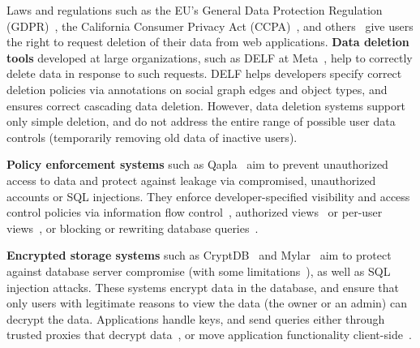 Laws and regulations such as the EU's General Data Protection Regulation
(GDPR)~\cite{eu:gdpr}, the California Consumer Privacy Act (CCPA)~\cite{ccpa},
and others~\cite{va:privacy-act, china:gdpr-like} give users the right to
request deletion of their data from web applications.
%
\textbf{Data deletion tools} developed at large organizations, such as DELF at
Meta~\cite{delf}, help to correctly delete data in response to such requests.
%
DELF helps developers specify correct deletion policies via annotations on
social graph edges and object types, and ensures correct cascading data
deletion.
%
However, data deletion systems support only simple deletion, and do not address
the entire range of possible user data controls (\eg temporarily removing old data of
inactive users). 
%
%
%
%

%
\textbf{Policy enforcement systems} such as Qapla~\cite{qapla} aim to prevent
unauthorized access to data and protect against leakage via compromised,
unauthorized accounts or SQL injections.
%
They enforce developer-specified visibility and access control policies via
information flow control~\cite{static, jeeves, jif, hails, ifdb}, authorized
views~\cite{oracle} or per-user views~\cite{multiverse}, or blocking or
rewriting database queries~\cite{blockaid, qapla, sieve}.
%
%
%
%
%

\textbf{Encrypted storage systems} such as CryptDB~\cite{cryptdb} and
Mylar~\cite{mylar} aim to protect against database server compromise (with some
limitations~\cite{grubbs}), as well as SQL injection attacks.
%
These systems encrypt data in the database, and ensure that only
users with legitimate reasons to view the data (\ie the owner or an
admin) can decrypt the data.
%
Applications handle keys, and send queries either through
trusted proxies that decrypt data~\cite{cryptdb}, or move application
functionality client-side~\cite{mylar}.
%

